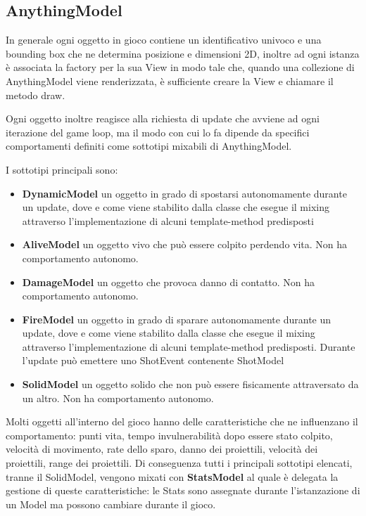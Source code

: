 \subsection{AnythingModel}
In generale ogni oggetto in gioco contiene un identificativo univoco e una bounding box che ne determina posizione e dimensioni 2D, inoltre ad ogni istanza è associata la factory per la sua View in modo tale che, quando una collezione di AnythingModel viene renderizzata, è sufficiente creare la View e chiamare il metodo draw. 

Ogni oggetto inoltre reagisce alla richiesta di update che avviene ad ogni iterazione del game loop, ma il modo con cui lo fa dipende da specifici comportamenti definiti come sottotipi mixabili di AnythingModel.

I sottotipi principali sono:
\begin{itemize}
    \item \textbf{DynamicModel} un oggetto in grado di spostarsi autonomamente durante un update, dove e come viene stabilito dalla classe che esegue il mixing attraverso l'implementazione di alcuni template-method predisposti
    \item \textbf{AliveModel} un oggetto vivo che può essere colpito perdendo vita. Non ha comportamento autonomo.
    \item \textbf{DamageModel} un oggetto che provoca danno di contatto. Non ha comportamento autonomo.
    \item \textbf{FireModel} un oggetto in grado di sparare autonomamente durante un update, dove e come viene stabilito dalla classe che esegue il mixing attraverso l'implementazione di alcuni template-method predisposti. Durante l'update può emettere uno ShotEvent contenente ShotModel
    \item \textbf{SolidModel} un oggetto solido che non può essere fisicamente attraversato da un altro. Non ha comportamento autonomo.
\end{itemize}

Molti oggetti all'interno del gioco hanno delle caratteristiche che ne influenzano il comportamento: 
punti vita, tempo invulnerabilità dopo essere stato colpito, velocità di movimento, rate dello sparo, danno dei proiettili, velocità dei proiettili, range dei proiettili. 
Di conseguenza tutti i principali sottotipi elencati, tranne il SolidModel, vengono mixati con \textbf{StatsModel} al quale è delegata la gestione di queste caratteristiche: le Stats sono assegnate durante l'istanzazione di un Model ma possono cambiare durante il gioco.

